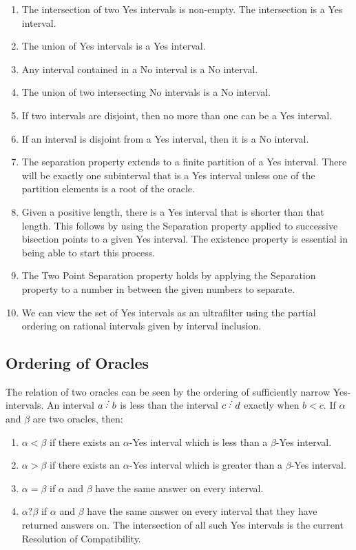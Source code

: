 \documentclass[12pt]{article}
\begin{document}
\begin{enumerate}
    \item The intersection of two Yes intervals is non-empty. The intersection is a Yes interval. 
    \item The union of Yes intervals is a Yes interval. 
    \item Any interval contained in a No interval is a No interval. 
    \item The union of two intersecting No intervals is a No interval. 
    \item If two intervals are disjoint, then no more than one can be a Yes interval. 
    \item If an interval is disjoint from a Yes interval, then it is a No interval. 
    \item The separation property extends to a finite partition of a Yes interval. There will be exactly one subinterval that is a Yes interval unless one of the partition elements is a root of the oracle.   
    \item Given a positive length, there is a Yes interval that is shorter than that length. This follows by using the Separation property applied to successive bisection points to a given Yes interval.  The existence property is essential in being able to start this process.
    \item The Two Point Separation property holds by applying the Separation property to a number in between the given numbers to separate. 
    \item We can view the set of Yes intervals as an ultrafilter using the partial ordering on rational intervals given by interval inclusion. 
\end{enumerate}

\subsection{Ordering of Oracles}

The relation of two oracles can be seen by the ordering of sufficiently narrow Yes-intervals. An interval $a\lte b$ is less than the interval $c\lte d$ exactly when $b < c$. If  $\alpha$ and  $\beta$ are two oracles, then:
\begin{enumerate}
\item $\alpha<\beta$ if there exists an  $\alpha$-Yes interval which is less than a  $\beta$-Yes interval.
\item $\alpha>\beta$ if there exists an  $\alpha$-Yes interval which is greater than a  $\beta$-Yes interval.
\item $\alpha=\beta$ if  $\alpha$ and  $\beta$ have the same answer on every interval.
\item $\alpha?\beta$ if  $\alpha$ and  $\beta$ have the same answer on every interval that they have returned answers on. The intersection of all such Yes intervals is the current Resolution of Compatibility. 
\end{enumerate}
\end{document}

